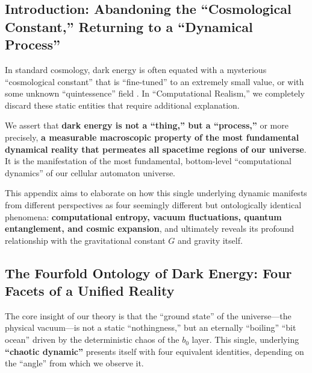 \documentclass[11pt, a4paper]{article}
\begin{document}
\subsection{Introduction: Abandoning the ``Cosmological Constant,'' Returning to a ``Dynamical Process''}
In standard cosmology, dark energy is often equated with a mysterious ``cosmological constant'' that is ``fine-tuned'' to an extremely small value, or with some unknown ``quintessence'' field \cite{Planck2020}. In ``Computational Realism,'' we completely discard these static entities that require additional explanation.

We assert that \textbf{dark energy is not a ``thing,'' but a ``process,''} or more precisely, \textbf{a measurable macroscopic property of the most fundamental dynamical reality that permeates all spacetime regions of our universe}. It is the manifestation of the most fundamental, bottom-level ``computational dynamics'' of our cellular automaton universe.

This appendix aims to elaborate on how this single underlying dynamic manifests from different perspectives as four seemingly different but ontologically identical phenomena: \textbf{computational entropy, vacuum fluctuations, quantum entanglement, and cosmic expansion}, and ultimately reveals its profound relationship with the gravitational constant $G$ and gravity itself.

\subsection{The Fourfold Ontology of Dark Energy: Four Facets of a Unified Reality}

The core insight of our theory is that the ``ground state'' of the universe—the physical vacuum—is not a static ``nothingness,'' but an eternally ``boiling'' ``bit ocean'' driven by the deterministic chaos of the $b_0$ layer. This single, underlying \textbf{``chaotic dynamic''} presents itself with four equivalent identities, depending on the ``angle'' from which we observe it.
\end{document}

